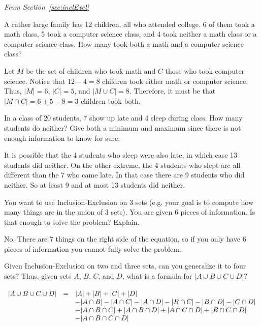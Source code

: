 \noindent
{\em From Section~\ref{sec:inclExcl}}

\begin{requ}
A rather large family has 12 children, all who attended college.
6 of them took a math class, 5 took a computer science class,
and  4 took neither a math class or a computer science class.
How many took both a math and a computer science class?
\begin{requanswer}
Let $M$ be the set of children who took math and $C$
those who took computer science. 
Notice that $12-4 = 8$ children took either math or computer science, 
Thus, 
$|M|=6$, $|C|=5$, and $|M\cup C|=8$. Therefore, it
must be that $|M\cap C|=6+5-8=3$ children took both.
\end{requanswer}
\end{requ}

\begin{requ}
In a class of 20 students, 7 show up late and 4 sleep during class. 
How many students do neither? Give both a minimum and maximum since there is not
enough information to know for sure.
\begin{requanswer}
It is possible that the 4 students who sleep were also late, in which case 13 students did neither.
On the other extreme, the 4 students who slept are all different than the 7 who came late. 
In that case there are 9 students who did neither.
So at least 9 and at most 13 students did neither.
\end{requanswer}
\end{requ}

\begin{requ}
You want to use Inclusion-Exclusion on 3 sets
(e.g. your goal is to compute how many things are in the union of 3 sets).  
You are given 6 pieces of information. 
Is that enough to solve the problem? Explain.
\begin{requanswer}
No. There are 7 things on the right side of the equation,
so if you only have 6 pieces of information you cannot fully solve the problem.
\end{requanswer}
\end{requ}

\begin{requ}
Given Inclusion-Exclusion on two and three sets, can you generalize it to four sets?
Thus, given sets $A$, $B$, $C$, and $D$, what is a formula for $|A\cup B\cup C\cup D|$?
\begin{requanswer}
$
\begin{array}[t]{lll}
|A \cup B \cup C\cup D| & = & |A| + |B| + |C|+|D|\\ & & 
-|A \cap B| - |A \cap C |  -|A\cap D| - |B \cap C| -|B\cap D| - |C\cap D|\\ & & 
+|A \cap B \cap C|
+|A \cap B \cap D|
+|A \cap C \cap D|
+|B \cap C \cap D|\\ & & 
-|A \cap B \cap C\cap D|
\end{array}
$
\end{requanswer}
\end{requ}

